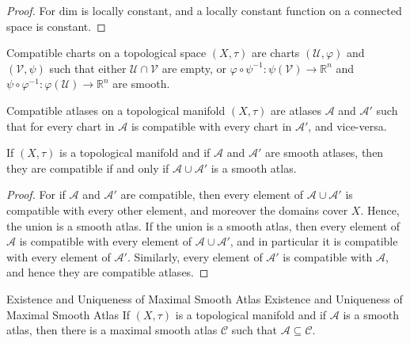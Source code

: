         \begin{proof}
            For $\textrm{dim}$ is locally constant, and a locally constant
            function on a connected space is constant.
        \end{proof}
        \begin{definition}
            Compatible charts on a topological space $(X,\tau)$ are charts
            $(\mathcal{U},\varphi)$ and $(\mathcal{V},\psi)$ such that either
            $\mathcal{U}\cap\mathcal{V}$ are empty, or
            $\varphi\circ\psi^{\minus{1}}:%
             \psi(\mathcal{V})\rightarrow\mathbb{R}^{n}$ and
            $\psi\circ\varphi^{\minus{1}}:%
             \varphi(\mathcal{U})\rightarrow\mathbb{R}^{n}$ are smooth.
        \end{definition}
        \begin{definition}
            Compatible atlases on a topological manifold $(X,\tau)$ are atlases
            $\mathcal{A}$ and $\mathcal{A}'$ such that for every chart in
            $\mathcal{A}$ is compatible with every chart in $\mathcal{A}'$, and
            vice-versa.
        \end{definition}
        \begin{theorem}
            If $(X,\tau)$ is a topological manifold and if $\mathcal{A}$ and
            $\mathcal{A}'$ are smooth atlases, then they are compatible if and
            only if $\mathcal{A}\cup\mathcal{A}'$ is a smooth atlas.
        \end{theorem}
        \begin{proof}
            For if $\mathcal{A}$ and $\mathcal{A}'$ are compatible, then
            every element of $\mathcal{A}\cup\mathcal{A}'$ is compatible with
            every other element, and moreover the domains cover $X$. Hence,
            the union is a smooth atlas. If the union is a smooth atlas, then
            every element of $\mathcal{A}$ is compatible with every element of
            $\mathcal{A}\cup\mathcal{A}'$, and in particular it is compatible
            with every element of $\mathcal{A}'$. Similarly, every element of
            $\mathcal{A}'$ is compatible with $\mathcal{A}$, and hence they are
            compatible atlases.
        \end{proof}
        \begin{ltheorem}{Existence and Uniqueness of Maximal Smooth Atlas}
                        {Existence and Uniqueness of Maximal Smooth Atlas}
            If $(X,\tau)$ is a topological manifold and if $\mathcal{A}$ is a
            smooth atlas, then there is a maximal smooth atlas $\mathcal{C}$
            such that $\mathcal{A}\subseteq\mathcal{C}$.
        \end{ltheorem}
